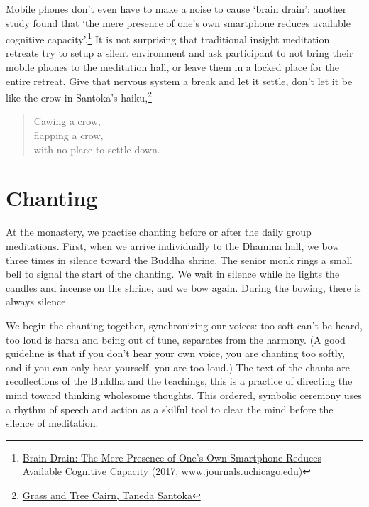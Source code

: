 Mobile phones don't even have to make a noise to cause `brain drain':
another study found that `the mere presence of one's own smartphone
reduces available cognitive capacity'.\footnote{\href{https://www.journals.uchicago.edu/doi/10.1086/691462}{Brain
  Drain: The Mere Presence of One's Own Smartphone Reduces Available
  Cognitive Capacity (2017, www.journals.uchicago.edu)}} It is not
surprising that traditional insight meditation retreats try to setup a
silent environment and ask participant to not bring their mobile phones
to the meditation hall, or leave them in a locked place for the entire
retreat. Give that nervous system a break and let it settle, don't let
it be like the crow in Santoka's haiku,\footnote{\href{https://www.goodreads.com/book/show/931086.Grass_and_Tree_Cairn}{Grass
  and Tree Cairn, Taneda Santoka}}

\begin{quote}
Cawing a crow,\\
flapping a crow,\\
with no place to settle down.
\end{quote}

\clearpage

\section{Chanting}


At the monastery, we practise chanting before or after the daily group
meditations. First, when we arrive individually to the Dhamma hall, we
bow three times in silence toward the Buddha shrine. The senior monk
rings a small bell to signal the start of the chanting. We wait in
silence while he lights the candles and incense on the shrine, and we
bow again. During the bowing, there is always silence.

We begin the chanting together, synchronizing our voices: too soft can't
be heard, too loud is harsh and being out of tune, separates from the
harmony. (A good guideline is that if you don't hear your own voice, you
are chanting too softly, and if you can only hear yourself, you are too
loud.) The text of the chants are recollections of the Buddha and the
teachings, this is a practice of directing the mind toward thinking
wholesome thoughts. This ordered, symbolic ceremony uses a rhythm of
speech and action as a skilful tool to clear the mind before the silence
of meditation.

